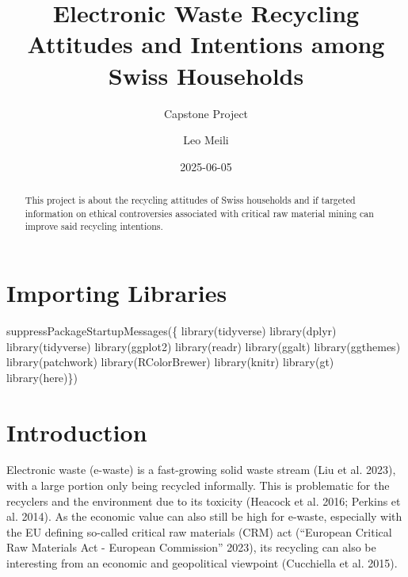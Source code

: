 \documentclass[
  letterpaper,
  DIV=11,
  numbers=noendperiod]{scrartcl}
\title{Electronic Waste Recycling Attitudes and Intentions among Swiss
Households}
\subtitle{Capstone Project}
\author{Leo Meili}
\date{2025-06-05}
\newenvironment{Shaded}{\begin{snugshade}}{\end{snugshade}}
\newcommand{\FunctionTok}[1]{\textcolor[rgb]{0.28,0.35,0.67}{#1}}
\newcommand{\NormalTok}[1]{\textcolor[rgb]{0.00,0.23,0.31}{#1}}
\renewcommand*\contentsname{Table of contents}
\newcommand\contentsname{Table of contents}
\begin{document}
\maketitle
\begin{abstract}
This project is about the recycling attitudes of Swiss households and if
targeted information on ethical controversies associated with critical
raw material mining can improve said recycling intentions.
\end{abstract}

\renewcommand*\contentsname{Table of contents}
{
\hypersetup{linkcolor=}
\setcounter{tocdepth}{3}
\tableofcontents
}

\section{Importing Libraries}\label{importing-libraries}

\begin{Shaded}
\begin{Highlighting}[]
\FunctionTok{suppressPackageStartupMessages}\NormalTok{(\{}
\FunctionTok{library}\NormalTok{(tidyverse)}
\FunctionTok{library}\NormalTok{(dplyr)}
\FunctionTok{library}\NormalTok{(tidyverse)}
\FunctionTok{library}\NormalTok{(ggplot2)}
\FunctionTok{library}\NormalTok{(readr)}
\FunctionTok{library}\NormalTok{(ggalt)}
\FunctionTok{library}\NormalTok{(ggthemes)}
\FunctionTok{library}\NormalTok{(patchwork)}
\FunctionTok{library}\NormalTok{(RColorBrewer)}
\FunctionTok{library}\NormalTok{(knitr)}
\FunctionTok{library}\NormalTok{(gt)}
\FunctionTok{library}\NormalTok{(here)\})}
\end{Highlighting}
\end{Shaded}

\section{Introduction}\label{introduction}

Electronic waste (e-waste) is a fast-growing solid waste stream (Liu et
al. 2023), with a large portion only being recycled informally. This is
problematic for the recyclers and the environment due to its toxicity
(Heacock et al. 2016; Perkins et al. 2014). As the economic value can
also still be high for e-waste, especially with the EU defining
so-called critical raw materials (CRM) act ({``European {Critical Raw
Materials Act} - {European Commission}''} 2023), its recycling can also
be interesting from an economic and geopolitical viewpoint (Cucchiella
et al. 2015).
\end{document}
